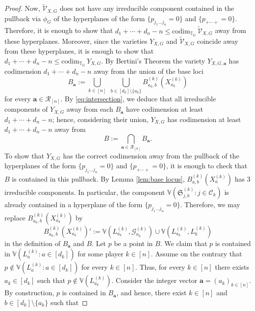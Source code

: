 \documentclass[11pt]{amsart}
\numberwithin{equation}{section}
\theoremstyle{plain}
\numberwithin{theorem}{section}
\theoremstyle{definition}
\begin{document}
\begin{proof}
Now, $\widetilde{\mathcal{V}}_{X,G}$ does not have any irreducible component contained in the pullback via $\phi_G$ of the hyperplanes of the form $\{p_{j_1\ldots j_n}=0\} $ and $\{p_{+\cdots+}=0\}$. Therefore, it is enough to show that $d_1+\cdots + d_n-n\leq\mathrm{codim}_{\mathbb{T}_G}\,\widetilde{\mathcal{V}}_{X,G}$ away from these hyperplanes.  Moreover, since the varieties  $Y_{X,G}$  and $\widetilde{\mathcal{V}}_{X,G}$ coincide away from these hyperplanes, it is enough to show that 
$d_1+\cdots + d_n-n\leq\mathrm{codim}_{\mathbb{T}_G}\,Y_{X,G}$.
By Bertini's Theorem
the variety $Y_{X,G,\mathbf{a}}$ has codimension  $d_1+\cdots + d_n-n$ away from the union of the base loci
\begin{equation}\label{eq: B a}
B_{\mathbf{a}}:=\bigcup_{k\in[n]}\,\,\bigcup_{b\in[d_k]\setminus\{a_k\}}B_{a_k,b}^{(k)}(X_{a_k}^{(k)})
\end{equation}
for every $\mathbf{a}\in\mathcal{R}_{[n]}$. By \eqref{eq:intersection}, we deduce that all irreducible components of $Y_{X,G}$ away from each $B_{\mathbf{a}}$ have codimension at least $d_1+\cdots + d_n-n$; hence, considering their union, $Y_{X,G}$ has codimension at least $d_1+\cdots + d_n-n$ away from
\begin{equation}\label{eq:big intersection}
B:=\bigcap_{\mathbf{a}\in\mathcal{R}_{[n]}}B_{\mathbf{a}}.
\end{equation}
To show that $Y_{X,G}$ has the correct codimension away from the pullback of the hyperplanes of the form $\{p_{j_1\ldots j_n}=0\} $ and $\{p_{+\cdots+}=0\}$, it is enough to check that $B$ is contained in this pullback. By Lemma \ref{lem:base locus}, $B_{a,b}^{(k)}(X_a^{(k)})$ has $3$ irreducible components. In particular, the component $\mathbb{V}(\mathfrak S_{j,b}^{(k)}:j\in\mathscr C_k)$ is already contained in a hyperplane of the form $\{p_{j_1\ldots j_n}=0\} $. Therefore, we may replace 
$B_{a_k,b}^{(k)}(X_{a_k}^{(k)})$ by 
\begin{equation}\label{eq:def new base locus}
B_{a_k,b}^{(k)}(X_{a_k}^{(k)})':= \mathbb{V}(L_{a_k}^{(k)},\mathcal G_{a_k}^{(k)})\cup\mathbb{V}(L_{a_k}^{(k)},L_b^{(k)})
\end{equation}
in the definition of $B_\mathbf{a}$ and $B$. Let $p$ be a point in $B$. We claim that $p$ is contained in $\mathbb{V}(L_a^{(k)}: a\in [d_k])$ for some player $k\in [n]$. Assume on the contrary that $p\not \in \mathbb{V}(L_a^{(k)}: a\in [d_k])$ for every $k\in [n]$. Thus, for every $k\in[n]$ there exists $a_k\in [d_k]$ such that $p\not\in \mathbb{V}(L_{a_k}^{(k)})$. Consider the integer vector $\mathbf{a}=(a_k)_{k\in[n]}$. By construction, $p$ is contained in $B_\mathbf{a}$, and hence, there exist $k\in [n]$ and $b\in[d_k]\setminus\{a_k\}$ such that 

\end{proof}
\end{document}
